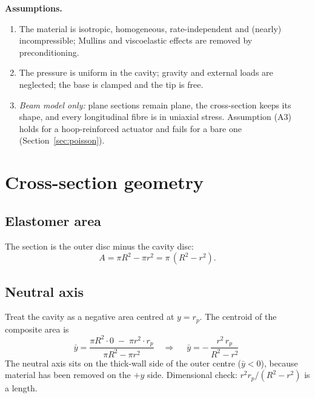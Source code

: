 \documentclass[11pt,a4paper]{article}
\numberwithin{equation}{section}
\newcommand{\rp}{r_p}
\begin{document}
\textbf{Assumptions.}
\begin{enumerate}[nosep,label=(A\arabic*)]
\item The material is isotropic, homogeneous, rate-independent and (nearly) incompressible; Mullins and
viscoelastic effects are removed by preconditioning.
\item The pressure is uniform in the cavity; gravity and external loads are neglected; the base is clamped and the tip is free.
\item \emph{Beam model only:} plane sections remain plane, the cross-section keeps its shape, and every longitudinal
fibre is in uniaxial stress. Assumption (A3) holds for a hoop-reinforced actuator and fails for a bare one (Section~\ref{sec:poisson}).
\end{enumerate}

\section{Cross-section geometry}\label{sec:section}

\subsection{Elastomer area}
The section is the outer disc minus the cavity disc:
\begin{equation}
A = \pi R^2 - \pi r^2 = \pi\,(R^2-r^2). \label{eq:A}
\end{equation}

\subsection{Neutral axis}
Treat the cavity as a negative area centred at $y=\rp$. The centroid of the composite area is
\begin{equation}
\bar y = \frac{\pi R^2\cdot 0 \;-\; \pi r^2\cdot \rp}{\pi R^2-\pi r^2}
\quad\Longrightarrow\quad
\boxed{\;\bar y = -\,\frac{r^2\,\rp}{R^2-r^2}\;} \label{eq:ybar}
\end{equation}
The neutral axis sits on the thick-wall side of the outer centre ($\bar y<0$), because material has been removed on the $+y$ side.
Dimensional check: $r^2\rp/(R^2-r^2)$ is a length.
\end{document}
